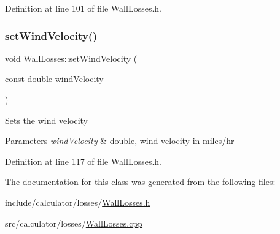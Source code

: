 Definition at line 101 of file Wall\+Losses.\+h.

\mbox{\label{class_wall_losses_ae376b7ce4e5b3c45a663395802c176a9}} 
\subsubsection{\texorpdfstring{set\+Wind\+Velocity()}{setWindVelocity()}}
{\footnotesize\ttfamily void Wall\+Losses\+::set\+Wind\+Velocity (\begin{DoxyParamCaption}\item[{const double}]{wind\+Velocity }\end{DoxyParamCaption})\hspace{0.3cm}{\ttfamily [inline]}}

Sets the wind velocity 
\begin{DoxyParams}{Parameters}
{\em wind\+Velocity} & double, wind velocity in miles/hr \\
\hline
\end{DoxyParams}


Definition at line 117 of file Wall\+Losses.\+h.



The documentation for this class was generated from the following files\+:\begin{DoxyCompactItemize}
\item 
include/calculator/losses/\hyperlink{_wall_losses_8h}{Wall\+Losses.\+h}\item 
src/calculator/losses/\hyperlink{_wall_losses_8cpp}{Wall\+Losses.\+cpp}\end{DoxyCompactItemize}
